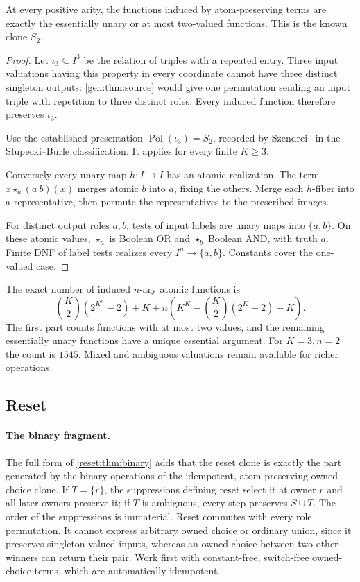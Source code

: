 \begin{proposition}\label{gen:thm:S2}
At every positive arity, the functions induced by atom-preserving terms
are exactly the essentially unary or at most two-valued functions.
This is the known clone $S_2$.
\end{proposition}
\begin{proof}
Let $\iota_3\subseteq I^3$ be the relation of triples with a repeated
entry. Three input valuations having this property in every
coordinate cannot have three distinct singleton outputs:
\cref{gen:thm:source} would give one permutation sending an input
triple with repetition to three distinct roles. Every induced function
therefore preserves $\iota_3$.

Use the established presentation $\operatorname{Pol}(\iota_3)=S_2$,
recorded by Szendrei~\cite[Proposition~2.2]{Szendrei2012} in the
S\l upecki--Burle classification. It applies for every finite $K\geq3$.


Conversely every unary map $h:I\to I$ has an atomic realization.
The term $x\star_a(a\ b)(x)$ merges atomic $b$ into $a$, fixing the
others. Merge each $h$-fiber into a representative, then permute the
representatives to the prescribed images.

For distinct output roles $a,b$, tests of input labels are unary maps
into $\{a,b\}$. On these atomic values, $\star_a$ is Boolean OR and
$\star_b$ Boolean AND, with truth $a$. Finite DNF of label tests
realizes every $I^n\to\{a,b\}$. Constants cover the one-valued case.
\end{proof}

The exact number of induced $n$-ary atomic functions is
\[
 \binom K2(2^{K^n}-2)+K+
 n\left(K^K-\binom K2(2^K-2)-K\right).
\]
The first part counts functions with at most two values, and the remaining essentially unary functions have a unique essential argument. For $K=3,n=2$ the count is $1545$. Mixed and ambiguous valuations remain available for richer operations.

\subsection{Reset}\label{app:proofs-reset}

\paragraph{The binary fragment.}
The full form of \cref{reset:thm:binary} adds that the reset clone is exactly the part generated by the binary operations of the idempotent, atom-preserving owned-choice clone. If $T=\{r\}$, the suppressions defining reset select it at owner $r$ and all later owners preserve it; if $T$ is ambiguous, every step preserves $S\cup T$. The order of the suppressions is immaterial. Reset commutes with every role permutation. It cannot express
arbitrary owned choice or ordinary union, since it preserves singleton-valued inputs, whereas an owned choice between two other winners can return their pair. Work first with constant-free, switch-free owned-choice terms, which are automatically idempotent.

